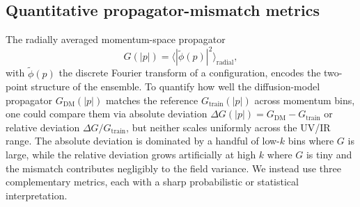%
%

\subsection{Quantitative propagator-mismatch metrics}
\label{sec:prop_mismatch_metrics}

The radially averaged momentum-space propagator
\begin{equation}
G(|p|) = \bigl\langle|\tilde\phi(p)|^2\bigr\rangle_{\text{radial}},
\label{eq:propagator}
\end{equation}
with $\tilde\phi(p)$ the discrete Fourier transform of a configuration, encodes the two-point structure of the ensemble. To quantify how well the diffusion-model propagator $G_{\text{DM}}(|p|)$ matches the reference $G_{\text{train}}(|p|)$ across momentum bins, one could compare them via absolute deviation $\Delta G(|p|)=G_{\text{DM}}-G_{\text{train}}$ or relative deviation $\Delta G/G_{\text{train}}$, but neither scales uniformly across the UV/IR range. The absolute deviation is dominated by a handful of low-$k$ bins where $G$ is large, while the relative deviation grows artificially at high $k$ where $G$ is tiny and the mismatch contributes negligibly to the field variance. We instead use three complementary metrics, each with a sharp probabilistic or statistical interpretation.


